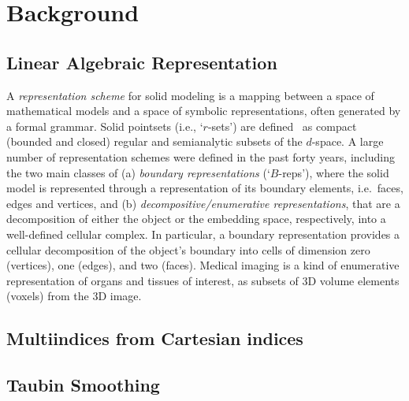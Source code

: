 \section{Background}\label{sec:background}


\subsection{Linear Algebraic Representation}\label{sec:aaaa}

A \emph{representation scheme} for solid modeling is a mapping between a space of mathematical models and a space of symbolic representations, often generated by a formal grammar.
Solid pointsets (i.e., `$r$-sets') are defined~\cite{requicha:80} as compact (bounded and closed) regular and semianalytic subsets of the $d$-space. A large number of representation schemes were defined in the past forty years, including the two main classes of (a) \emph{boundary representations} (`$B$-reps'), where the solid model is represented through a representation of its boundary elements, i.e.~faces, edges and vertices, and (b) \emph{decompositive/enumerative representations}, that are a decomposition of either the object or the embedding space, respectively, into a well-defined cellular complex. In particular, a boundary representation provides a cellular decomposition of the object's boundary into cells of dimension zero (vertices), one (edges), and two (faces). Medical imaging is a kind of enumerative representation of organs and tissues of interest, as subsets of 3D volume elements (voxels) from the 3D image. 


\subsection{Multiindices from Cartesian indices}\label{sec:aaaa}


\subsection{Taubin Smoothing}\label{sec:aaaa}



